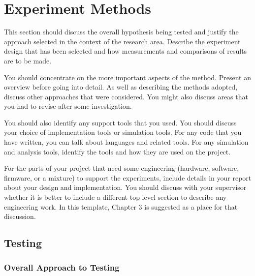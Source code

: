 \chapter{Experiment Methods}

This section should discuss the overall hypothesis being tested and justify the approach selected in the context of the research area.  Describe the experiment design that has been selected and how measurements and comparisons of results are to be made. 

You should concentrate on the more important aspects of the method. Present an overview before going into detail. As well as describing the methods adopted, discuss other approaches that were considered. You might also discuss areas that you had to revise after some investigation. 

You should also identify any support tools that you used. You should discuss your choice of implementation tools or simulation tools. For any code that you have written, you can talk about languages and related tools. For any simulation and analysis tools, identify the tools and how they are used on the project. 

For the parts of your project that need some engineering (hardware, software, firmware, or a mixture) to support the experiments, include details in your report about your design and implementation. You should discuss with your supervisor whether it is better to include a different top-level section to describe any engineering work.  In this template, Chapter 3 is suggested as a place for that discussion.

\section{Testing}
\subsection{Overall Approach to Testing}
